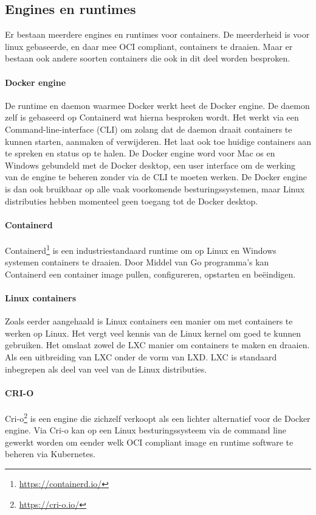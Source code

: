 \subsection{Engines en runtimes}
Er bestaan meerdere engines en runtimes voor containers. De meerderheid is voor linux gebaseerde, en daar mee OCI compliant, containers te draaien. Maar er bestaan ook andere soorten containers die ook in dit deel worden besproken.

\paragraph{Docker engine}
De runtime en daemon waarmee Docker werkt heet de Docker engine. De daemon zelf is gebaseerd op Containerd wat hierna besproken wordt. Het werkt via een Command-line-interface (CLI) om zolang dat de daemon draait containers te kunnen starten, aanmaken of verwijderen. Het laat ook toe huidige containers aan te spreken en status op te halen. De Docker engine word voor Mac os en Windows gebundeld met de Docker desktop, een user interface om de werking van de engine te beheren zonder via de CLI  te moeten werken. De Docker engine is dan ook bruikbaar op alle vaak voorkomende besturingssystemen, maar Linux distributies hebben momenteel geen toegang tot de Docker desktop.
\paragraph{Containerd}
Containerd\footnote{\url{https://containerd.io/}} is een industriestandaard runtime om op Linux en Windows systemen containers te draaien. Door Middel van Go programma’s kan Containerd een container image pullen, configureren, opstarten en beëindigen.
\paragraph{Linux containers}
Zoals eerder aangehaald is Linux containers een manier om met containers te werken op Linux. Het vergt veel kennis van de Linux kernel om goed te kunnen gebruiken.  Het omslaat zowel de LXC manier om containers te maken en draaien. Als een uitbreiding van LXC onder de vorm van LXD. LXC is standaard inbegrepen als deel van veel van de Linux distributies.  
\paragraph{CRI-O}
Cri-o\footnote{\url{https://cri-o.io/}} is een engine die zichzelf verkoopt als een lichter alternatief voor de Docker engine.  Via Cri-o kan op een Linux besturingssysteem via de command line gewerkt worden om eender welk OCI compliant image en runtime software te beheren via Kubernetes.

